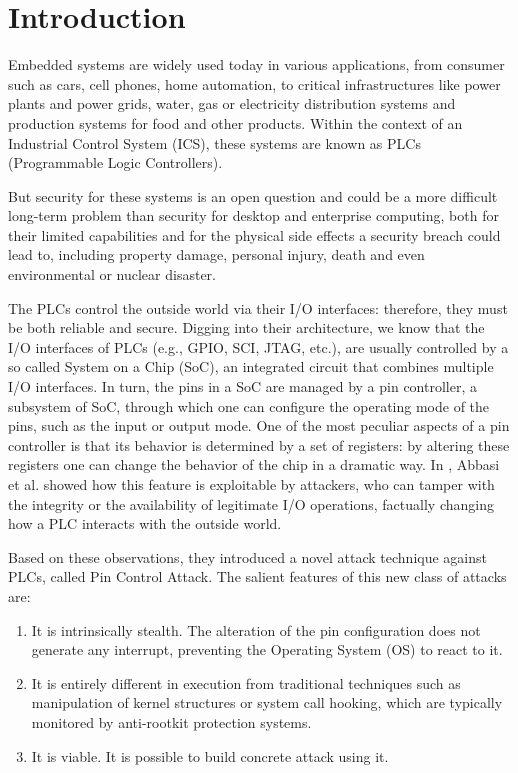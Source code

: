 \chapter{Introduction}
\label{chap:intro}

Embedded systems are widely used today in various applications, from consumer such as cars, cell phones, home automation, to critical infrastructures
like power plants and power grids, water, gas or electricity distribution systems and production systems for food and other products.
Within the context of an Industrial Control System (ICS), these systems are known as PLCs (Programmable Logic Controllers).

But security for these systems is an open question and could be a more difficult long-term problem than security for desktop and enterprise computing,
both for their limited capabilities and for the physical side effects a security breach could lead to, including property damage, personal injury, death and
even environmental or nuclear disaster.

The PLCs control the outside world via their I/O interfaces: therefore, they must be both reliable and secure.
Digging into their architecture, we know that the I/O interfaces of PLCs (e.g., GPIO, SCI, JTAG, etc.),
are usually controlled by a so called System on a Chip (SoC), an integrated circuit that combines multiple I/O interfaces.
In turn, the pins in a SoC are managed by a pin controller, a subsystem of SoC, through which one can configure the operating mode of the pins, such as the input or output mode.
One of the most peculiar aspects of a pin controller is that its behavior is determined by a set of registers: by altering these registers one can change the behavior
of the chip in a dramatic way. In \cite{ghostplc}, Abbasi et al. showed how this feature is exploitable by attackers, who can tamper with
the integrity or the availability of legitimate I/O operations, factually changing how a PLC interacts with the outside world.

Based on these observations, they introduced a novel attack technique against PLCs, called Pin Control Attack.
The salient features of this new class of attacks are:
\begin{enumerate}
	\item It is intrinsically stealth. The alteration of the pin configuration does not generate any interrupt, preventing the Operating System (OS) to react to it.
	\item It is entirely different in execution from traditional techniques such as manipulation of kernel structures or system call hooking, which are typically
		monitored by anti-rootkit protection systems.
	\item It is viable. It is possible to build concrete attack using it.
\end{enumerate}

